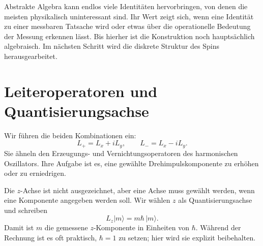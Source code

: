 \begin{classroomqa}
\end{classroomqa}

Abstrakte Algebra kann endlos viele Identitäten hervorbringen, von denen die meisten physikalisch uninteressant sind. Ihr Wert zeigt sich, wenn eine Identität zu einer messbaren Tatsache wird oder etwas über die operationelle Bedeutung der Messung erkennen lässt. Bis hierher ist die Konstruktion noch hauptsächlich algebraisch. Im nächsten Schritt wird die diskrete Struktur des Spins herausgearbeitet.

\begin{classroomqa}
\end{classroomqa}

\section{Leiteroperatoren und Quantisierungsachse}

Wir führen die beiden Kombinationen ein:
\begin{equation}
L_+=L_x+iL_y,
\qquad
L_-=L_x-iL_y.
\end{equation}
Sie ähneln den Erzeugungs- und Vernichtungsoperatoren des harmonischen Oszillators. Ihre Aufgabe ist es, eine gewählte Drehimpulskomponente zu erhöhen oder zu erniedrigen.

Die \(z\)-Achse ist nicht ausgezeichnet, aber eine Achse muss gewählt werden, wenn eine Komponente angegeben werden soll. Wir wählen \(z\) als Quantisierungsachse und schreiben
\begin{equation}
L_z\lvert m\rangle=m\hbar\,\lvert m\rangle.
\end{equation}
Damit ist \(m\) die gemessene \(z\)-Komponente in Einheiten von \(\hbar\). Während der Rechnung ist es oft praktisch, \(\hbar=1\) zu setzen; hier wird sie explizit beibehalten.

